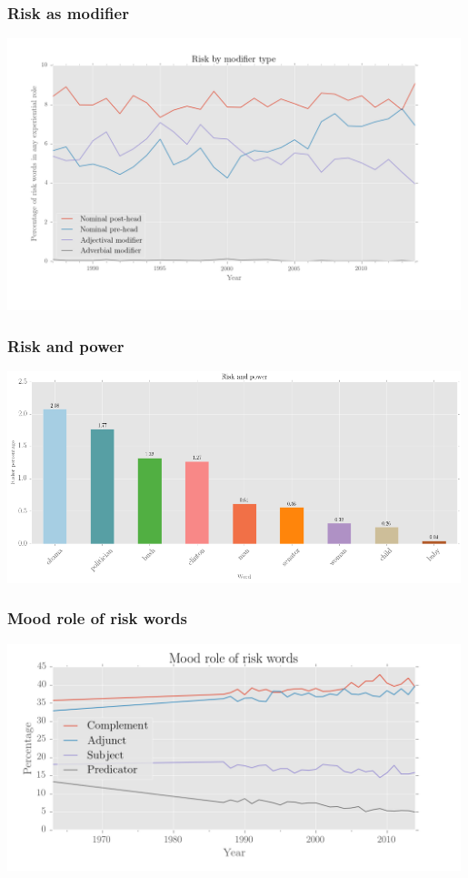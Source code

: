 \documentclass{beamer}       %
\begin{document}
\begin{frame}
    \frametitle{Risk as modifier}
    \centering
    \includegraphics[width=0.99\textwidth]{../images/risk_by_mod_type_colour}
\end{frame}

\begin{frame}
    \frametitle{Risk and power}
    \centering
    \includegraphics[width=0.99\textwidth]{../images/risk-and-power-2}
\end{frame}

\begin{frame}
    \frametitle{Mood role of risk words}
    \centering
    \includegraphics[width=0.99\textwidth]{../images/mood-role-of-risk-words}
\end{frame}
\end{document}
